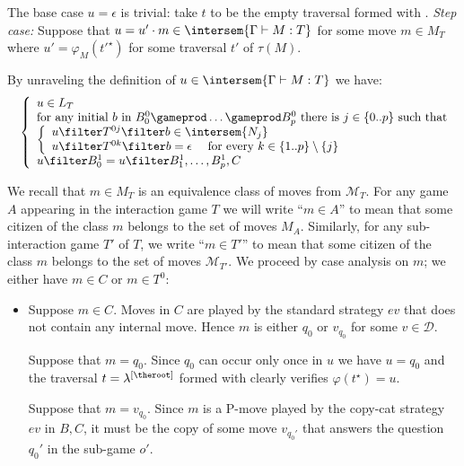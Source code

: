\begin{itemize}[$\bullet$]
\begin{enumerate}
    The base case $u=\epsilon$ is trivial: take $t$ to be the empty traversal formed with .
    \emph{Step case:} Suppose that $u = u' \cdot m \in
    \intersem{\Gamma \vdash M : T}$ for some move $m \in
    M_T$ where $u' = \varphi_M(t'^\star)$ for some traversal
    $t'$ of $\tau(M)$.

    By unraveling the definition of $u \in \intersem{\Gamma \vdash M : T}$ we have:
    \begin{eqnarray*}
    && \left\{
    \begin{array}{ll}
        u \in L_T \\
        \hbox{for any initial $b$ in $B_0^0 \gameprod \ldots \gameprod B_p^0$ there is $j \in \{0..p\}$ such that } \\
        \left\{\begin{array}{ll}
            u \filter T^{0j} \filter b  \in \intersem{N_j} \\
            u \filter T^{0k} \filter b  = \epsilon \quad \mbox{ for every } k\in \{1..p\}\setminus\{j\}
        \end{array}
        \right. \\
        u \filter B^1_0 = u \filter B^1_1, \ldots, B^1_p, C
    \end{array}
    \right.
    \end{eqnarray*}

We recall that $m \in M_T$ is an equivalence class of moves
from $\mathcal{M}_T$. For any game $A$ appearing in the
interaction game $T$ we will write ``$m \in A$'' to mean
that some citizen of the class $m$ belongs to the set of
moves $M_A$. Similarly, for any sub-interaction game $T'$ of
$T$, we write ``$m \in T'$'' to mean that some citizen of
the class $m$ belongs to the set of moves
$\mathcal{M}_{T'}$. We proceed by case analysis on $m$; we either have $m\in C$ or $m\in T^0$:
    \begin{itemize}
    \item Suppose $m \in C$. Moves in $C$ are played by the standard strategy $ev$ that does not contain any internal move. Hence $m$ is either $q_0$ or $v_{q_0}$ for some $v\in\mathcal{D}$.

    Suppose that $m=q_0$. Since $q_0$ can occur only once in
    $u$ we have $u=q_0$ and the traversal $t=\lambda^{[\theroot]}$ formed with  clearly verifies $\varphi(t^\star) = u$.

    Suppose that $m=v_{q_0}$. Since $m$ is a P-move played by the
    copy-cat strategy $ev$ in $B,C$, it must be the copy of some move $v_{q_0'}$ that answers the question $q_0'$ in the sub-game $o'$.


\end{itemize}
\end{enumerate}
\end{itemize}
